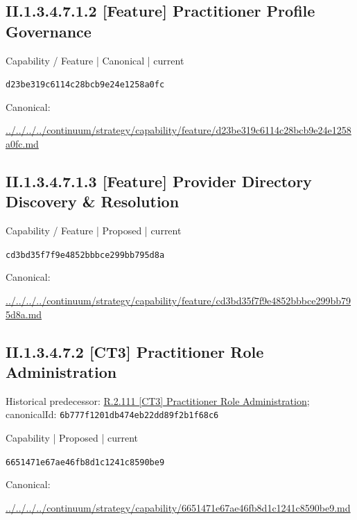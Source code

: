 \documentclass[10pt,a4paper]{article}
\begin{document}
\subsection*{II.1.3.4.7.1.2 [Feature] Practitioner Profile Governance}
\label{element-d23be319c6114c28bcb9e24e1258a0fc}
{\small Capability / Feature | Canonical | current}\par
\texttt{d23be319c6114c28bcb9e24e1258a0fc}\par
Canonical: \par
{\footnotesize\url{../../../../continuum/strategy/capability/feature/d23be319c6114c28bcb9e24e1258a0fc.md}}\par
\subsection*{II.1.3.4.7.1.3 [Feature] Provider Directory Discovery \& Resolution}
\label{element-cd3bd35f7f9e4852bbbce299bb795d8a}
{\small Capability / Feature | Proposed | current}\par
\texttt{cd3bd35f7f9e4852bbbce299bb795d8a}\par
Canonical: \par
{\footnotesize\url{../../../../continuum/strategy/capability/feature/cd3bd35f7f9e4852bbbce299bb795d8a.md}}\par
\subsection*{II.1.3.4.7.2 [CT3] Practitioner Role Administration}
Historical predecessor: \hyperref[element-6b777f1201db474eb22dd89f2b1f68c6]{R.2.111 [CT3] Practitioner Role Administration}; canonicalId: \texttt{6b777f1201db474eb22dd89f2b1f68c6}\par
\label{element-6651471e67ae46fb8d1c1241c8590be9}
{\small Capability | Proposed | current}\par
\texttt{6651471e67ae46fb8d1c1241c8590be9}\par
Canonical: \par
{\footnotesize\url{../../../../continuum/strategy/capability/6651471e67ae46fb8d1c1241c8590be9.md}}\par
\end{document}
